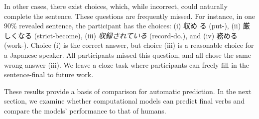 In other cases, there exist choices, which, while incorrect, could naturally
complete the sentence.  These questions are frequently missed. For instance, in
one 90\% revealed sentence, the participant has the choices: (i) 収め
る (put-), (ii) 厳しくなる (strict-become), (iii) {\it 収録されている}
(record-do.), and (iv) 務める (work-).  Choice (i)
is the correct answer, but choice (iii) is a reasonable choice for a Japanese
speaker.  All participants missed this question, and all chose the same wrong
answer (iii).  We leave a cloze task where participants can freely fill in the
sentence-final to future work.

These results provide a basis of comparison for automatic prediction.  In the
next section, we examine whether computational models can predict final
verbs and compare the models' performance to that of humans.